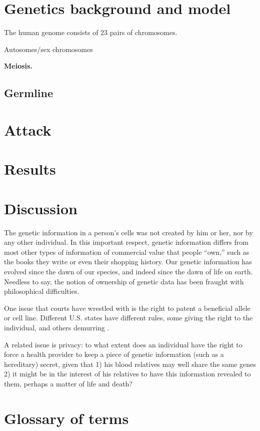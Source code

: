 \documentclass{article}
\begin{document}
\section{Genetics background and model}
The human genome consists of 23 pairs of chromosomes. 

Autosomes/sex chromosomes

{\bf Meiosis.}

\subsection{Germline}

\section{Attack}

\section{Results}

\section{Discussion}
The genetic information in a person's cells was not created by him or her, nor by any other individual. In this important respect, genetic information differs from most other types of information of commercial value that people ``own,'' such as the books they write or even their shopping history. Our genetic information has evolved since the dawn of our species, and indeed since the dawn of life on earth. Needless to say, the notion of ownership of genetic data has been fraught with philosophical difficulties.

One issue that courts have wrestled with is the right to patent a beneficial allele or cell line. Different U.S. states have different rules, some giving the right to the individual, and others demurring \cite{john-moore-who-owns-your-genetic-information}.

A related issue is  privacy: to what extent does an individual have the right to force a health provider to keep a piece of genetic information (such as a hereditary) secret, given that 1) his blood relatives may well share the same genes 2) it might be in the interest of his relatives to have this information revealed to them, perhaps a matter of life and death?


\section{Glossary of terms}


\end{document}
